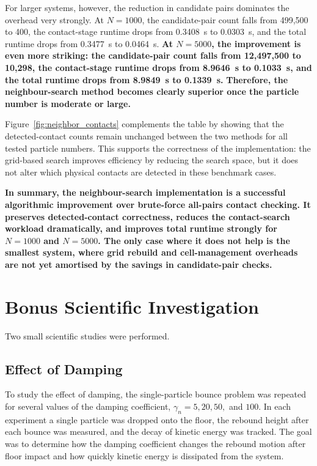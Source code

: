 \documentclass[conference]{IEEEtran}
\begin{document}
For larger systems, however, the reduction in candidate pairs dominates the overhead very strongly. At $N=1000$, the candidate-pair count falls from 499,500 to 400, the contact-stage runtime drops from 0.3408~s to 0.0303~s, and the total runtime drops from 0.3477~s to 0.0464~s. \textbf{At $N=5000$, the improvement is even more striking: the candidate-pair count falls from 12,497,500 to 10,298, the contact-stage runtime drops from 8.9646~s to 0.1033~s, and the total runtime drops from 8.9849~s to 0.1339~s.} \textbf{Therefore, the neighbour-search method becomes clearly superior once the particle number is moderate or large.}

Figure~\ref{fig:neighbor_contacts} complements the table by showing that the detected-contact counts remain unchanged between the two methods for all tested particle numbers. This supports the correctness of the implementation: the grid-based search improves efficiency by reducing the search space, but it does not alter which physical contacts are detected in these benchmark cases.

\textbf{In summary, the neighbour-search implementation is a successful algorithmic improvement over brute-force all-pairs contact checking. It preserves detected-contact correctness, reduces the contact-search workload dramatically, and improves total runtime strongly for $N=1000$ and $N=5000$. The only case where it does not help is the smallest system, where grid rebuild and cell-management overheads are not yet amortised by the savings in candidate-pair checks.}

\section{Bonus Scientific Investigation}
Two small scientific studies were performed.

\subsection{Effect of Damping}
To study the effect of damping, the single-particle bounce problem was repeated for several values of the damping coefficient, $\gamma_n = 5, 20, 50,$ and $100$. In each experiment a single particle was dropped onto the floor, the rebound height after each bounce was measured, and the decay of kinetic energy was tracked. The goal was to determine how the damping coefficient changes the rebound motion after floor impact and how quickly kinetic energy is dissipated from the system.
\end{document}
